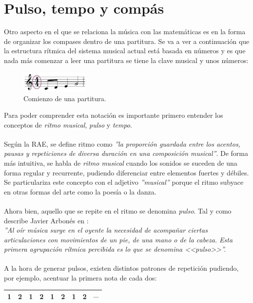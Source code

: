 \documentclass[a4paper, openright, 11pt, titlepage]{report}
\theoremstyle{definition}\newtheorem{defin}[propo]{Definition}
\theoremstyle{definition}\newtheorem{obser}[propo]{Remark}
\theoremstyle{definition}\newtheorem{ejem}[propo]{Ejemplo}
\theoremstyle{definition}\newtheorem{algoritmo}[propo]{Algoritmo}
\begin{document}
\chapter{Pulso, tempo y compás}
Otro aspecto en el que se relaciona la música con las matemáticas es en la forma de organizar los compases dentro de una partitura. Se va a ver a continuación que la estructura rítmica del sistema musical actual está basada en números y es que nada más comenzar a leer una partitura se tiene la clave musical y unos números:
\begin{figure}[H]
    \centering
    \includegraphics[width = 0.3\textwidth]{compas.png}
    \caption{Comienzo de una partitura.}
\end{figure}
Para poder comprender esta notación es importante primero entender los conceptos de \textit{ritmo musical}, \textit{pulso} y \textit{tempo}.\\\\
Según la RAE, se define ritmo como \textit{''la proporción guardada entre los acentos, pausas y repeticiones de diversa duración en una composición musical''}. De forma más intuitiva, se habla de \textit{ritmo musical} cuando los sonidos se suceden de una forma regular y recurrente, pudiendo diferenciar entre elementos fuertes y débiles.\\
Se particulariza este concepto con el adjetivo \textit{''musical''} porque el ritmo subyace en otras formas del arte como la poesía o la danza.\\\\
Ahora bien, aquello que se repite en el ritmo se denomina \textit{pulso}. Tal y como describe Javier Arbonés en \cite{libro}:\\
\textit{''Al oír música surge en el oyente la necesidad de acompañar ciertas articulaciones con movimientos de un pie, de una mano o de la cabeza. Esta primera agrupación rítmica percibida es lo que se denomina <<pulso>>''.}\\\\
A la hora de generar pulsos, existen distintos patrones de repetición pudiendo, por ejemplo, acentuar la primera nota de cada dos:
\begin{table}[H]
    \centering
    \begin{tabular}{|c|c|c|c|c|c|c|c|c|}
    \hline
        \cellcolor{acento}1 & 2 & \cellcolor{acento}1 & 2 & \cellcolor{acento}1 & 2 & \cellcolor{acento}1 & 2 & $\cdots$ \\
    \hline
    \end{tabular}
\end{table}
\end{document}
